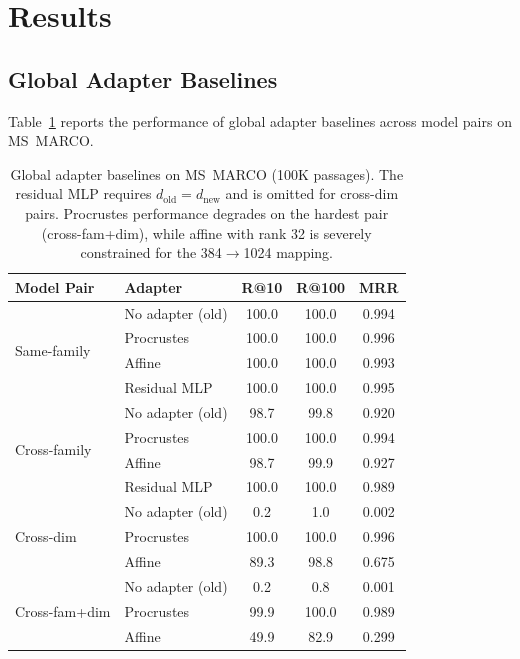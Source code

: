 \documentclass[11pt,a4paper]{article}
\begin{document}
\section{Results}
\label{sec:results}

\subsection{Global Adapter Baselines}
\label{sec:results:global}

Table~\ref{tab:global} reports the performance of global adapter baselines across model pairs on MS~MARCO.

\begin{table}[t]
\centering
\small
\begin{tabular}{@{}llccc@{}}
\toprule
\textbf{Model Pair} & \textbf{Adapter} & \textbf{R@10} & \textbf{R@100} & \textbf{MRR} \\
\midrule
\multirow{4}{*}{Same-family}
  & No adapter (old)  & 100.0 & 100.0 & 0.994 \\
  & Procrustes         & 100.0 & 100.0 & 0.996 \\
  & Affine             & 100.0 & 100.0 & 0.993 \\
  & Residual MLP       & 100.0 & 100.0 & 0.995 \\
\midrule
\multirow{4}{*}{Cross-family}
  & No adapter (old)  & 98.7 & 99.8 & 0.920 \\
  & Procrustes         & 100.0 & 100.0 & 0.994 \\
  & Affine             & 98.7 & 99.9 & 0.927 \\
  & Residual MLP       & 100.0 & 100.0 & 0.989 \\
\midrule
\multirow{3}{*}{Cross-dim}
  & No adapter (old)  & 0.2 & 1.0 & 0.002 \\
  & Procrustes         & 100.0 & 100.0 & 0.996 \\
  & Affine             & 89.3 & 98.8 & 0.675 \\
\midrule
\multirow{3}{*}{Cross-fam+dim}
  & No adapter (old)  & 0.2 & 0.8 & 0.001 \\
  & Procrustes         & 99.9 & 100.0 & 0.989 \\
  & Affine             & 49.9 & 82.9 & 0.299 \\
\bottomrule
\end{tabular}
\caption{Global adapter baselines on MS~MARCO (100K passages). The residual MLP requires $d_{\mathrm{old}} = d_{\mathrm{new}}$ and is omitted for cross-dim pairs. Procrustes performance degrades on the hardest pair (cross-fam+dim), while affine with rank 32 is severely constrained for the 384$\to$1024 mapping.}
\label{tab:global}
\end{table}
\end{document}
